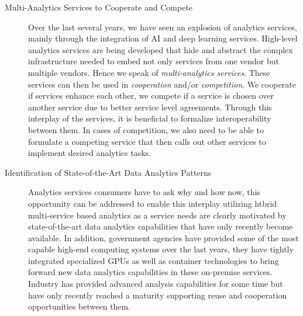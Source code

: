 \begin{description}
\item[Multi-Analytics Services to Cooperate and Compete]

Over the last several years, we have seen an explosion of analytics
services, mainly through the integration of AI and deep learning
services. High-level analytics services are being developed that hide
and abstract the complex infrastructure needed to embed not only
services from one vendor but multiple vendors. Hence we speak of {\em
multi-analytics services}. These services can then be used in {\em
cooperation} and/or {\em competition}. We cooperate if services
enhance each other, we compete if a service is chosen over another
service due to better service level agreements. Through this interplay
of the services, it is beneficial to formalize interoperability
between them. In cases of competition, we also need to be able to
formulate a competing service that then calls out other services to
implement desired analytics tasks.

\item[Identification of State-of-the-Art Data Analytics Patterns]

Analytics services consumers have to ask why and how now,
this opportunity can be addressed to enable this interplay utilizing
htbrid multi-service based analytics as a service needs are clearly
motivated by state-of-the-art data analytics capabilities that have
only recently become available.  In addition, government agencies have
provided some of the most capable high-end computing systems over the
last years, they have tightly integrated specialized GPUs as well as
container technologies to bring forward new data analytics
capabilities in these on-premise services. Industry has provided
advanced analysis capabilities for some time but have only recently
reached a maturity supporting reuse and cooperation opportunities
between them.

\end{description}
